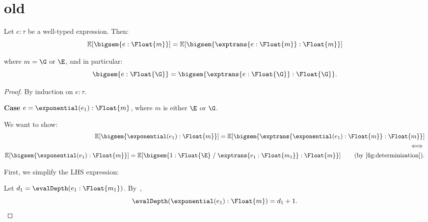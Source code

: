 \section{old}
\begin{theorem}
  Let $e : \tau$ be a well-typed expression. Then:
  \[
    \mathbb{E}[\bigsem{e : \Float{m}}]
    =
    \mathbb{E}[\bigsem{\exptrans{e : \Float{m}} : \Float{m}}]
  \]

  where $m = \G$ or $\E$, and in particular:
  \[
    \bigsem{e : \Float{\G}}
    =
    \bigsem{\exptrans{e : \Float{\G}} : \Float{\G}}.
  \]
\end{theorem}

\begin{proof}
  By induction on $e : \tau$.

  \textbf{Case} $e = \exponential(e_1) : \Float{m}$, where $m$ is either $\E$ or $\G$.

  We want to show:
  \begin{align*}
    \mathbb{E}[\bigsem{\exponential(e_1) : \Float{m}}]
    =
    \mathbb{E}[\bigsem{\exptrans{\exponential(e_1) : \Float{m}} : \Float{m}}] \\
    \iff \\
    \mathbb{E}[\bigsem{\exponential(e_1) : \Float{m}}]
    =
    \mathbb{E}\!\left[
      \bigsem{
        1 : \Float{\E} \;/\; \exptrans{e_1 : \Float{m_1}}
        : \Float{m}
      }
    \right] \tag{by~\Cref{fig:determinization}}.
  \end{align*}

  First, we simplify the LHS expression: 

  Let $d_1 = \evalDepth(e_1 : \Float{m_1})$. By~,
  \[
    \evalDepth(\exponential(e_1) : \Float{m})
    =
    d_1 + 1.
  \]


\end{proof}
